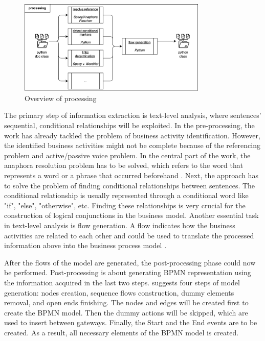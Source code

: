 \begin{figure}[h]
    \centering
    \caption{Overview of processing}
    \includegraphics[width=0.8\textwidth]{tum-resources/images/theoretical_extraction_pro.png}
\end{figure}

The primary step of information extraction is text-level analysis, where sentences' sequential, conditional relationships will be exploited. In the pre-processing, the work has already tackled the problem of business activity identification. However, the identified business activities might not be complete because of the referencing problem and active/passive voice problem. In the central part of the work, the anaphora resolution problem has to be solved, which refers to the word that represents a word or a phrase that occurred beforehand \cite{literature_review_4}. Next, the approach has to solve the problem of finding conditional relationships between sentences. The conditional relationship is usually represented through a conditional word like "if", "else", "otherwise", etc. Finding these relationships is very crucial for the construction of logical conjunctions in the business model. Another essential task in text-level analysis is flow generation. A flow indicates how the business activities are related to each other and could be used to translate the processed information above into the business process model \cite{t2m_1}.


After the flows of the model are generated, the post-processing phase could now be performed. Post-processing is about generating BPMN representation using the information acquired in the last two steps. \cite{t2m_1} suggests four steps of model generation: nodes creation, sequence flows construction, dummy elements removal, and open ends finishing. The nodes and edges will be created first to create the BPMN model. Then the dummy actions will be skipped, which are used to insert between gateways. Finally, the Start and the End events are to be created. As a result, all necessary elements of the BPMN model is created. 

